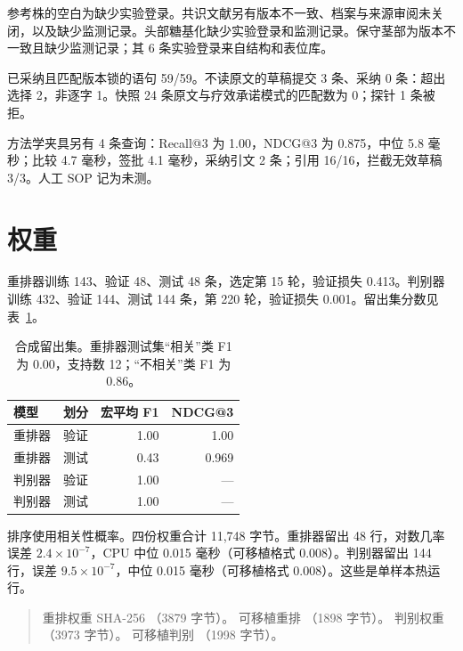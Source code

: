 参考株的空白为缺少实验登录。共识文献另有版本不一致、档案与来源审阅未关闭，以及缺少监测记录。头部糖基化缺少实验登录和监测记录。保守茎部为版本不一致且缺少监测记录；其 6 条实验登录来自结构和表位库。

已采纳且匹配版本锁的语句 59/59。不读原文的草稿提交 3 条、采纳 0 条：超出选择 2，非逐字 1。快照 24 条原文与疗效承诺模式的匹配数为 0；探针 1 条被拒。

方法学夹具另有 4 条查询：Recall@3 为 1.00，NDCG@3 为 0.875，中位 5.8 毫秒；比较 4.7 毫秒，签批 4.1 毫秒，采纳引文 2 条；引用 16/16，拦截无效草稿 3/3。人工 SOP 记为未测。

\section{权重}
重排器训练 143、验证 48、测试 48 条，选定第 15 轮，验证损失 0.413。判别器训练 432、验证 144、测试 144 条，第 220 轮，验证损失 0.001。留出集分数见表~\ref{tab:f1}。

\begin{table}[ht]
\centering
\caption{合成留出集。重排器测试集“相关”类 F1 为 0.00，支持数 12；“不相关”类 F1 为 0.86。}
\label{tab:f1}
\begin{tabular}{llrr}
\toprule
模型 & 划分 & 宏平均 F1 & NDCG@3 \\
\midrule
重排器 & 验证 & 1.00 & 1.00 \\
重排器 & 测试 & 0.43 & 0.969 \\
判别器 & 验证 & 1.00 & --- \\
判别器 & 测试 & 1.00 & --- \\
\bottomrule
\end{tabular}
\end{table}

排序使用相关性概率。四份权重合计 11{,}748 字节。重排器留出 48 行，对数几率误差 $2.4\times 10^{-7}$，CPU 中位 0.015 毫秒（可移植格式 0.008）。判别器留出 144 行，误差 $9.5\times 10^{-7}$，中位 0.015 毫秒（可移植格式 0.008）。这些是单样本热运行。

\begin{quote}\footnotesize
重排权重 SHA-256 （3879 字节）。
可移植重排 （1898 字节）。
判别权重 （3973 字节）。
可移植判别 （1998 字节）。
\end{quote}

